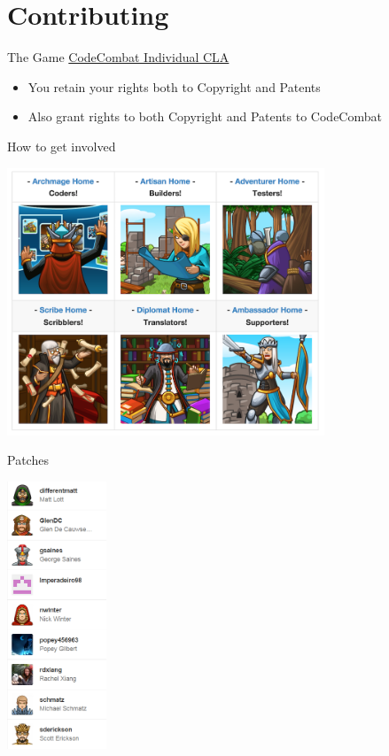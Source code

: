\documentclass[10pt, compress]{beamer}
\begin{document}
\section{Contributing}

\begin{frame}{The Game}
    \href{http://codecombat.com/cla}{CodeCombat Individual CLA}
    \begin{itemize}
    \item You retain your rights both to Copyright and Patents
    \item Also grant rights to both Copyright and Patents to CodeCombat
    \end{itemize}
\end{frame}

\begin{frame}{How to get involved}
    \centerline{\includegraphics[width=\textwidth,height=8cm, keepaspectratio]{images/getinvolved.png}}
\end{frame}

\begin{frame}{Patches}
   \centerline{\includegraphics[width=\textwidth, height=8cm, keepaspectratio]{images/close.png}}
    
\end{frame}
\end{document}
